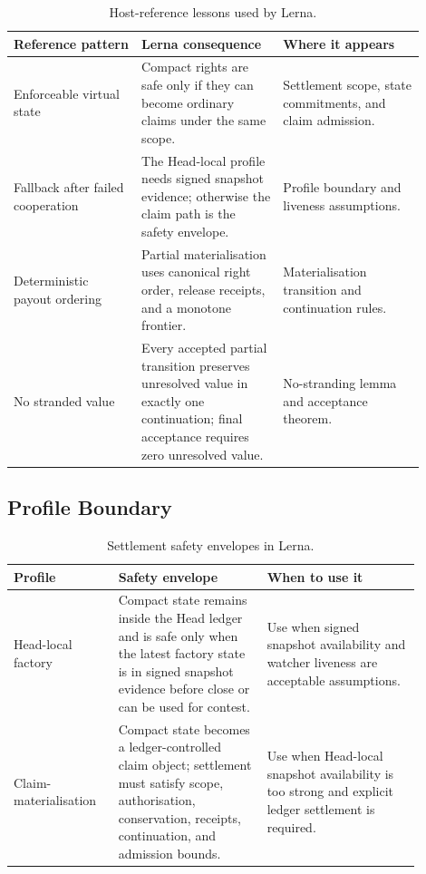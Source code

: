 \documentclass[a4paper,11pt]{article}
\theoremstyle{definition}
\theoremstyle{plain}
\theoremstyle{remark}
\begin{document}
\begin{table}[t]
\centering
\caption{Host-reference lessons used by Lerna.}
\label{tab:host-lessons}
\begin{tabular}{L{0.28\linewidth}L{0.31\linewidth}L{0.31\linewidth}}
\toprule
\textbf{Reference pattern} & \textbf{Lerna consequence} & \textbf{Where it appears}\\
\midrule
Enforceable virtual state & Compact rights are safe only if they can become
ordinary claims under the same scope. & Settlement scope, state commitments, and
claim admission.\\
Fallback after failed cooperation & The Head-local profile needs signed
snapshot evidence; otherwise the claim path is the safety envelope. & Profile
boundary and liveness assumptions.\\
Deterministic payout ordering & Partial materialisation uses canonical right
order, release receipts, and a monotone frontier. & Materialisation transition
and continuation rules.\\
No stranded value & Every accepted partial transition preserves unresolved
value in exactly one continuation; final acceptance requires zero unresolved
value. & No-stranding lemma and acceptance theorem.\\
\bottomrule
\end{tabular}
\end{table}

\subsection{Profile Boundary}
\label{sec:profile-boundary}

\begin{table}[t]
\centering
\caption{Settlement safety envelopes in Lerna.}
\label{tab:profile-boundary}
\begin{tabular}{L{0.22\linewidth}L{0.33\linewidth}L{0.34\linewidth}}
\toprule
\textbf{Profile} & \textbf{Safety envelope} & \textbf{When to use it}\\
\midrule
Head-local factory & Compact state remains inside the Head ledger and is safe
only when the latest factory state is in signed snapshot evidence before close
or can be used for contest. & Use when signed snapshot availability and watcher
liveness are acceptable assumptions.\\
Claim-materialisation & Compact state becomes a ledger-controlled claim object;
settlement must satisfy scope, authorisation, conservation, receipts,
continuation, and admission bounds. & Use when Head-local snapshot availability
is too strong and explicit ledger settlement is required.\\
\bottomrule
\end{tabular}
\end{table}
\end{document}

